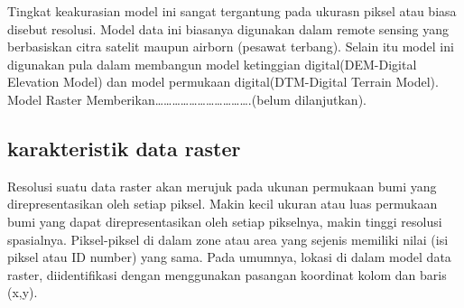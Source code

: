 Tingkat keakurasian model ini sangat tergantung pada ukurasn piksel atau biasa disebut resolusi.
Model data ini biasanya digunakan dalam remote sensing yang berbasiskan citra satelit maupun airborn (pesawat terbang).
Selain itu model ini digunakan pula dalam membangun model ketinggian digital(DEM-Digital Elevation Model) dan model permukaan digital(DTM-Digital Terrain Model).
Model Raster Memberikan…………………………….(belum dilanjutkan). 

\subsection{karakteristik data raster}
Resolusi suatu data raster akan merujuk pada ukunan permukaan bumi yang direpresentasikan oleh setiap piksel. 
Makin kecil ukuran atau luas permukaan bumi yang dapat direpresentasikan oleh setiap pikselnya, 
makin tinggi resolusi spasialnya.
Piksel-piksel di dalam zone atau area yang sejenis memiliki nilai (isi piksel atau ID number) yang sama. 
Pada umumnya, lokasi di dalam model data raster, diidentifikasi dengan menggunakan pasangan koordinat kolom dan baris (x,y).

